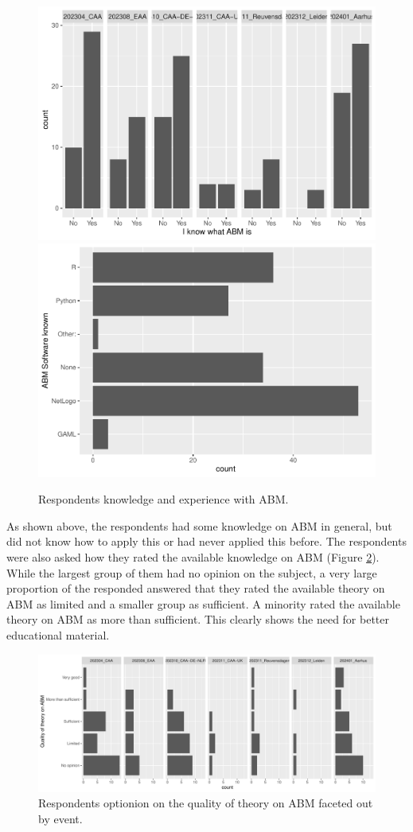\documentclass[
]{article}
\begin{document}
\begin{figure}
\includegraphics[width=0.5\linewidth]{paper_files/figure-latex/abm-knowledge-1} \includegraphics[width=0.5\linewidth]{paper_files/figure-latex/abm-knowledge-2} \caption{Respondents knowledge and experience with ABM.}\label{fig:abm-knowledge}
\end{figure}

As shown above, the respondents had some knowledge on ABM in general, but did not know how to apply this or had never applied this before. The respondents were also asked how they rated the available knowledge on ABM (Figure \ref{fig:available-theory}). While the largest group of them had no opinion on the subject, a very large proportion of the responded answered that they rated the available theory on ABM as limited and a smaller group as sufficient. A minority rated the available theory on ABM as more than sufficient. This clearly shows the need for better educational material.

\begin{figure}
\centering
\includegraphics{paper_files/figure-latex/available-theory-1.pdf}
\caption{\label{fig:available-theory}Respondents optionion on the quality of theory on ABM faceted out by event.}
\end{figure}
\end{document}

